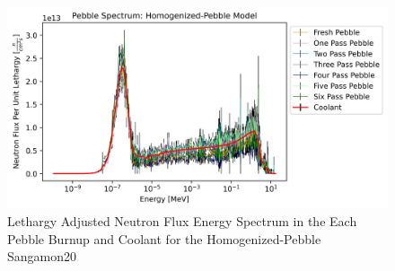\begin{figure}[H]
\centering
  \includegraphics[width=0.95\linewidth]{figures/pebs_spec_homog_er}
  \caption{Lethargy Adjusted Neutron Flux Energy Spectrum in the Each Pebble Burnup and Coolant for the Homogenized-Pebble Sangamon20}
  \label{fig:hom-peb}
\end{figure}
